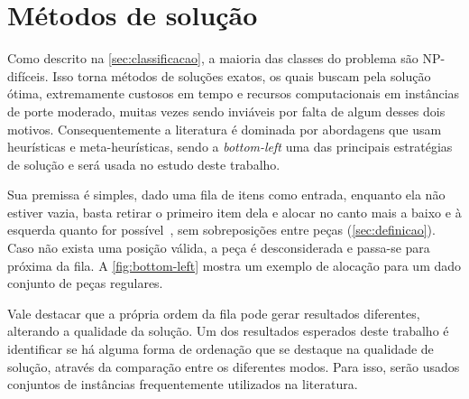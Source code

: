 \chapter{Métodos de solução}\label{ch:bottom-left}

Como descrito na \autoref{sec:classificacao}, a maioria das classes do problema são NP-difíceis.
Isso torna métodos de soluções exatos, os quais buscam pela solução ótima, extremamente custosos
em tempo e recursos computacionais em instâncias de porte moderado, muitas vezes sendo inviáveis
por falta de algum desses dois motivos.
Consequentemente a literatura é dominada por abordagens que usam heurísticas e meta-heurísticas,
sendo a \textit{bottom-left} uma das principais estratégias de solução e será usada no estudo
deste trabalho.



Sua premissa é simples, dado uma fila de itens como entrada, enquanto ela não estiver vazia,
basta retirar o primeiro item dela e alocar no canto mais a baixo e à esquerda quanto for
possível~\cite{aprendizado-reforco}, sem sobreposições entre peças (\autoref{sec:definicao}).
Caso não exista uma posição válida, a peça é desconsiderada e passa-se para próxima da fila.
A \autoref{fig:bottom-left} mostra um exemplo de alocação para um dado conjunto de peças regulares.

Vale destacar que a própria ordem da fila pode gerar resultados diferentes, alterando a qualidade
da solução.
Um dos resultados esperados deste trabalho é identificar se há alguma forma de ordenação que
se destaque na qualidade de solução, através da comparação entre os diferentes modos.
Para isso, serão usados conjuntos de instâncias frequentemente utilizados na literatura.




